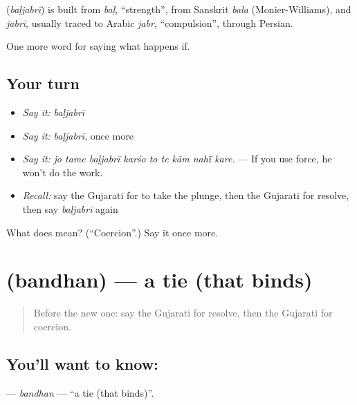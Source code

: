 \begin{cousinweb}
\textbf{} (\emph{baḷjabrī}) is built from \emph{baḷ}, \textquotedblleft{}strength\textquotedblright{}, from Sanskrit \emph{bala} (Monier-Williams), and \emph{jabrī}, usually traced to Arabic \emph{jabr}, \textquotedblleft{}compulsion\textquotedblright{}, through Persian.
\end{cousinweb}

\begin{grammarlens}[title={What you've built}]
One more word for saying what happens if.
\end{grammarlens}

\subsection*{Your turn}
\begin{itemize}
\raggedright
  \item \emph{Say it:} \emph{baḷjabrī}
  \item \emph{Say it:} \emph{baḷjabrī}, once more
  \item \emph{Say it:} \emph{jo tame baḷjabrī karśo to te kām nahī̃ kare.} — If you use force, he won't do the work.
  \item \emph{Recall:} say the Gujarati for to take the plunge, then the Gujarati for resolve, then say \emph{baḷjabrī} again
\end{itemize}

\begin{tcolorbox}[breakable,colback=teal!4,colframe=teal!35!black,title={Before you move on}]
What does  mean? (\textquotedblleft{}Coercion\textquotedblright{}.) Say it once more.
\end{tcolorbox}
\section[\texorpdfstring{\gu{બંધન} (bandhan)}{બંધન (bandhan)}]{ (bandhan) — a tie (that binds)}

\label{lesson:GU-C540-bandhan}



\begin{quote}
Before the new one: say the Gujarati for resolve, then the Gujarati for coercion.
\end{quote}

\subsection*{You'll want to know: }
\textbf{} — \emph{bandhan} — \textquotedblleft{}a tie (that binds)\textquotedblright{}.

